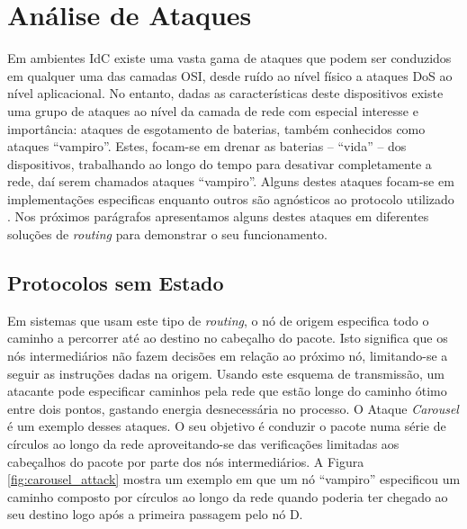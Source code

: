 \documentclass{llncs}
\begin{document}
\section{Análise de Ataques}
\label{sec:attack_analysis}

Em ambientes \ac{IdC} existe uma vasta gama de ataques que podem ser conduzidos em qualquer uma das camadas \ac{OSI}, desde ruído ao nível físico a ataques \ac{DoS} ao nível aplicacional. No entanto, dadas as características deste dispositivos existe uma grupo de ataques ao nível da camada de rede com especial interesse e importância: ataques de esgotamento de baterias, também conhecidos como ataques ``vampiro''.
Estes, focam-se em drenar as baterias -- ``vida'' -- dos dispositivos, trabalhando ao longo do tempo para desativar completamente a rede, daí serem chamados ataques ``vampiro''. Alguns destes ataques focam-se em implementações especificas enquanto outros são agnósticos ao protocolo utilizado \cite{Vasserman2013}\cite{Pongle2015}. Nos próximos parágrafos apresentamos alguns destes ataques em diferentes soluções de \textit{routing} para demonstrar o seu funcionamento.

\subsection{Protocolos sem Estado}
\label{sec:source_routing}
Em sistemas que usam este tipo de \textit{routing}, o nó de origem especifica todo o caminho a percorrer até ao destino no cabeçalho do pacote. Isto significa que os nós intermediários não fazem decisões em relação ao próximo nó, limitando-se a seguir as instruções dadas na origem. Usando este esquema de transmissão, um atacante pode especificar caminhos pela rede que estão longe do caminho ótimo entre dois pontos, gastando energia desnecessária no processo. O Ataque \textit{Carousel} é um exemplo desses ataques. O seu objetivo é conduzir o pacote numa série de círculos ao longo da rede aproveitando-se das verificações limitadas aos cabeçalhos do pacote por parte dos nós intermediários. A Figura \ref{fig:carousel_attack} mostra um exemplo em que um nó ``vampiro'' especificou um caminho composto por círculos ao longo da rede quando poderia ter chegado ao seu destino logo após a primeira passagem pelo nó D.
\end{document}
